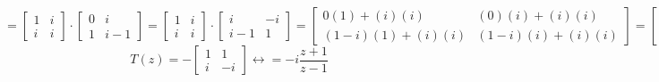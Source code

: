 \documentclass[10pt]{article}
\begin{document}
\begin{examplebox}
            \scriptsize$$
            = \begin{bmatrix}1 & i \\ i & i\end{bmatrix} \cdot \begin{bmatrix}0 & i \\ 1 & i-1\end{bmatrix} 
            = \begin{bmatrix}1 & i \\ i & i\end{bmatrix} \cdot \begin{bmatrix}i & -i \\ i-1 & 1\end{bmatrix} 
            = \begin{bmatrix} 0(1) + (i)(i) & (0)(i) + (i)(i) \\ (1-i)(1)+ (i)(i) & (1-i)(i) + (i)(i)\end{bmatrix} 
            = \begin{bmatrix} i^2 & i^2 \\ -i & i\end{bmatrix}
            $$
            \normalsize$$T(z)  = -\begin{bmatrix}1 & 1 \\ i & -i \end{bmatrix}\longleftrightarrow = -i \frac{z+1}{z-1}$$

        \end{examplebox}
        


    
        
\end{document}
